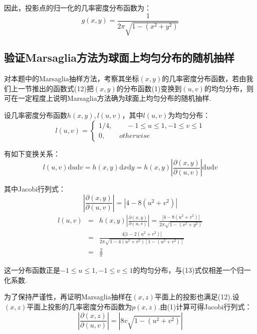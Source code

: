 \documentclass[12pt,a4paper,utf8]{ctexart}
\begin{document}
因此，投影点的归一化的几率密度分布函数为：
\begin{equation}
    g(x,y) = \frac{1}{2\pi \sqrt{1-(x^2+y^2)}}
\end{equation}

\subsection{验证Marsaglia方法为球面上均匀分布的随机抽样}

对本题中的Marsaglia抽样方法，考察其坐标$(x,y)$的几率密度分布函数，若由我们上一节推出的函数式(12)把$(x,y)$的分布函数(1)变换到$(u,v)$的均匀分布，则可在一定程度上说明Marsaglia方法确为球面上均匀分布的随机抽样.

设几率密度分布函数$h(x,y),l(u,v)$，其中$l(u,v)$为均匀分布：
\begin{equation}
    l(u,v)=
    \begin{cases}
        1/4, \qquad -1 \leq u \leq 1, -1 \leq v \leq 1 \\
        0, \qquad otherwise
    \end{cases}
\end{equation}

有如下变换关系：
\begin{equation}
    l(u,v) \textrm{d}u \textrm{d}v = h(x,y) \textrm{d}x \textrm{d}y 
    = h(x,y) \left | \frac{\partial (x,y)}{\partial(u,v)} \right | \textrm{d}u
    \textrm{d}v
\end{equation}

其中Jacobi行列式：
\begin{equation}
    \left | \frac{\partial (x,y)}{\partial(u,v)} \right | = |4 - 8(u^2+v^2)|
\end{equation}
\begin{eqnarray}
    l(u,v) &=& h(x,y) \left | \frac{\partial (x,y)}{\partial(u,v)} \right |
    = \frac{|4-8(u^2+v^2)|}{2\pi \sqrt{1-(x^2+y^2)}} \nonumber \\
           &=& \frac{4|1-2(u^2+v^2)|}{2\pi \sqrt{1-4(u^2+v^2)[1-(u^2+v^2)]} }
           \nonumber \\
           &=& \frac{2}{\pi}  
\end{eqnarray}

这一分布函数正是$-1 \leq u \leq 1, -1 \leq v \leq
1$的均匀分布，与(13)式仅相差一个归一化系数.

为了保持严谨性，再证明Marsaglia抽样在$(x,z)$平面上的投影也满足(12).设$(x,z)$平面上投影的几率密度分布函数为$p(x,z)$.由(1)计算可得Jacobi行列式：
\begin{equation}
    \left | \frac{ \partial (x,z)}{\partial (u,v)} \right | = |8v
    \sqrt{1-(u^2+v^2)}|
\end{equation}
\end{document}
